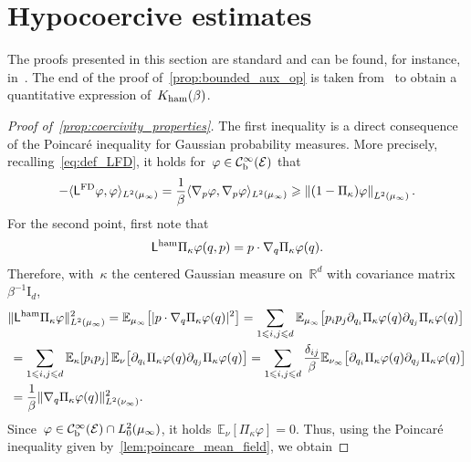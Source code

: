 \documentclass[onefignum,onetabnum]{siamart251216} %
\newcommand{\expect}{\mathbb E}
\newcommand{\norm}[1]{\left\lVert#1\right\rVert}
\newcommand{\real}{\mathbb R}
\newcommand{\av}[1]{\langle #1 \rangle}
\newcommand{\mc}[1]{\mathcal{#1}}
\renewcommand{\leq}{\leqslant}
\renewcommand{\geq}{\geqslant}
\newcommand{\mescin}{\mu}
\newcommand{\mespos}{\nu}
\newcommand{\mesvit}{\kappa}
\newcommand{\projvit}{\Pi_{\kappa}}
\newcommand{\Lham}{\mathsf{L}^{\rm{ham}}}
\newcommand{\LFD}{\mathsf{L}^{\rm{FD}}}
\newcommand{\norml}[1]{\norm{#1}_{L^2(\mescin_\infty)}}
\newcommand{\kham}{K_{\rm{ham}}(\beta)}
\theoremstyle{plain}
\numberwithin{equation}{section}
\numberwithin{theorem}{section}
\begin{document}
\section{Hypocoercive estimates}
\label{sec:hypo_estimates}
The proofs presented in this section are standard and can be found, for instance, in~\cite{roussel2018spectral,iacobucci2019convergence,addala20212}. The end of the proof of~\cref{prop:bounded_aux_op} is taken from~\cite[Proposition 3.5(ii)]{bernard2022hypocoercivity} to obtain a quantitative expression of~$\kham$.
\begin{proof}[{Proof of~\cref{prop:coercivity_properties}}]
    The first inequality is a direct consequence of the Poincaré inequality for Gaussian probability measures. More precisely, recalling~\eqref{eq:def_LFD}, it holds for~$\varphi\in \mc{C}_{\rm b}^\infty(\mc{E})$ that
    \[
    -\av{\LFD\varphi,\varphi}_{L^2(\mescin_\infty)} = \frac{1}{\beta}\av{\nabla_p\varphi,\nabla_p\varphi}_{L^2(\mescin_\infty)}
    \geq \norml{(1-\projvit)\varphi}.
    \]
    For the second point, first note that
    \begin{align}
        \label{eq:reecriture_lham_projp}
        \Lham\projvit\varphi(q,p) = p\cdot \nabla_q \projvit \varphi(q).
    \end{align}
    Therefore, with~$\mesvit$ the centered Gaussian measure on~$\real^d$ with covariance matrix~$\beta^{-1}\text{I}_d$,
    \begin{align}
         \notag
        &\|\Lham\projvit \varphi\|_{L^2(\mescin_\infty)}^2 = \expect_{\mescin_\infty}\!\left[|p\cdot \nabla_q \projvit \varphi(q)|^2\right]
        = \sum_{1\leq i,j \leq d} \expect_{\mescin_\infty}\!\left[p_i p_j\partial_{q_i} \projvit \varphi(q)\partial_{q_j}\projvit \varphi(q)\right]  \\
        \label{eq:inter2}
        &\, = \sum_{1\leq i,j \leq d} \expect_{\mesvit}\!\left[p_i p_j\right]\expect_{\mespos}\!\left[\partial_{q_i}\projvit \varphi(q) \partial_{q_j}\projvit \varphi(q)\right] =  \sum_{1\leq i,j \leq d} \frac{\delta_{ij}}{\beta}\expect_{\mespos_\infty}\!\left[\partial_{q_i}\projvit \varphi(q) \partial_{q_j}\projvit \varphi(q)\right] \\
        \notag
        &\, = \frac{1}{\beta}\|\nabla_q \projvit \varphi(q)\|_{L^2(\mespos_\infty)}^2.
    \end{align}
   Since~$ \varphi \in \mc{C}_{\rm b}^\infty(\mc{E})\cap L_0^2(\mescin_\infty)$, it holds~$\expect_{\mespos}\!\left[\projvit\varphi\right] = 0$. Thus, using the Poincaré inequality given by~\cref{lem:poincare_mean_field}, we obtain

\end{proof}
\end{document}
